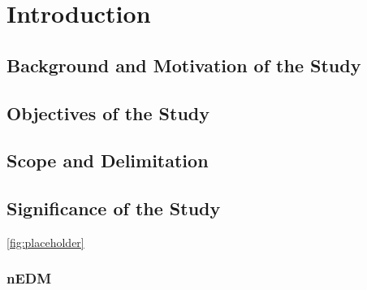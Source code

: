 \chapter{Introduction}

\section{Background and Motivation of the Study}
\lipsum[2]

\section{Objectives of the Study}
\lipsum[2]

\section{Scope and Delimitation}
\lipsum[2]

\section{Significance of the Study}
\lipsum[2]
\cite{Sakharov1967} \cref{fig:placeholder}
\subsection{nEDM}
